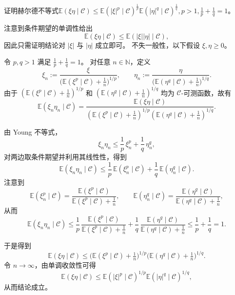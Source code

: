\documentclass{ctexart}
\begin{document}
\begin{problem}\label{pro:5}
  证明赫尔德不等式\(\mathbb{E}(\xi \eta \mid \mathcal{C}) \leq \mathbb{E}(|\xi|^p \mid \mathcal{C})^{\frac{1}{p}} \mathbb{E}(|\eta|^q \mid \mathcal{C})^{\frac{1}{q}}, p >1, \frac{1}{p} + \frac{1}{q} =1 \)。
\end{problem}
\begin{solution}
  注意到条件期望的单调性给出
  \[
    \mathbb{E}(\xi\eta\mid\mathcal C)
    \le \mathbb{E}(|\xi||\eta|\mid\mathcal C),
  \]
  因此只需证明结论对 $|\xi|$ 与 $|\eta|$ 成立即可。
  不失一般性，以下假设 $\xi,\eta\ge 0$。

  令 $p,q>1$ 满足 $\frac1p+\frac1q=1$。
  对任意 $n\in\mathbb N$，定义
  \[
    \xi_n
    :=\frac{\xi}{\bigl(\mathbb E(\xi^p\mid\mathcal C)+\frac1n\bigr)^{1/p}},
    \qquad
    \eta_n
    :=\frac{\eta}{\bigl(\mathbb E(\eta^q\mid\mathcal C)+\frac1n\bigr)^{1/q}}.
  \]
  由于
  \(
    (\mathbb E(\xi^p\mid\mathcal C)+\frac1n)^{1/p}
  \)
  和
  \(
    (\mathbb E(\eta^q\mid\mathcal C)+\frac1n)^{1/q}
  \)
  均为 $\mathcal C$-可测函数，故有
  \[
    \mathbb E(\xi_n\eta_n\mid\mathcal C)
    =
    \frac{\mathbb E(\xi\eta\mid\mathcal C)}
    {(\mathbb E(\xi^p\mid\mathcal C)+\frac1n)^{1/p}
    (\mathbb E(\eta^q\mid\mathcal C)+\frac1n)^{1/q}}.
  \]

  由 Young 不等式，
  \[
    \xi_n\eta_n
    \le \frac1p\,\xi_n^p+\frac1q\,\eta_n^q,
  \]
  对两边取条件期望并利用其线性性，得到
  \[
    \mathbb E(\xi_n\eta_n\mid\mathcal C)
    \le
    \frac1p\,\mathbb E(\xi_n^p\mid\mathcal C)
    +\frac1q\,\mathbb E(\eta_n^q\mid\mathcal C).
  \]
  注意到
  \[
    \mathbb E(\xi_n^p\mid\mathcal C)
    =
    \frac{\mathbb E(\xi^p\mid\mathcal C)}
    {\mathbb E(\xi^p\mid\mathcal C)+\frac1n},
    \qquad
    \mathbb E(\eta_n^q\mid\mathcal C)
    =
    \frac{\mathbb E(\eta^q\mid\mathcal C)}
    {\mathbb E(\eta^q\mid\mathcal C)+\frac1n},
  \]
  从而
  \[
    \mathbb E(\xi_n\eta_n\mid\mathcal C)
    \le
    \frac1p\,
    \frac{\mathbb E(\xi^p\mid\mathcal C)}
    {\mathbb E(\xi^p\mid\mathcal C)+\frac1n}
    +
    \frac1q\,
    \frac{\mathbb E(\eta^q\mid\mathcal C)}
    {\mathbb E(\eta^q\mid\mathcal C)+\frac1n}
    \le
    \frac1p+\frac1q
    =1.
  \]

  于是得到
  \[
    \mathbb E(\xi\eta\mid\mathcal C)
    \le
    \bigl(\mathbb E(\xi^p\mid\mathcal C)+\tfrac1n\bigr)^{1/p}
    \bigl(\mathbb E(\eta^q\mid\mathcal C)+\tfrac1n\bigr)^{1/q}.
  \]
  令 $n\to\infty$，由单调收敛性可得
  \[
    \mathbb E(\xi\eta\mid\mathcal C)
    \le
    \mathbb E(|\xi|^p\mid\mathcal C)^{1/p}
    \mathbb E(|\eta|^q\mid\mathcal C)^{1/q},
  \]
  从而结论成立。

\end{solution}
\end{document}
